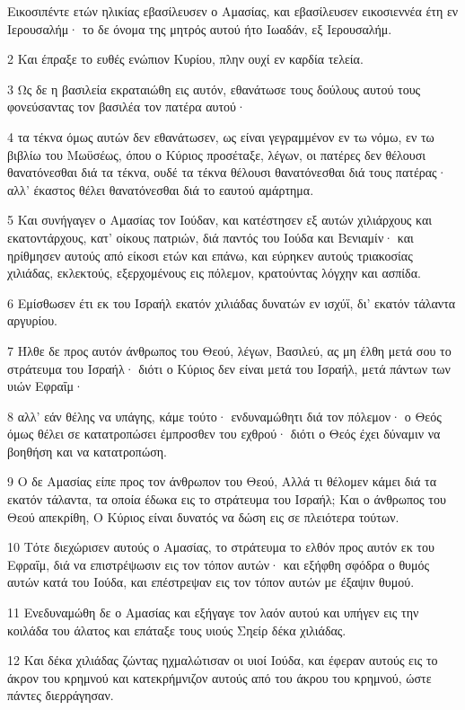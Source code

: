 \par Εικοσιπέντε ετών ηλικίας εβασίλευσεν ο Αμασίας, και εβασίλευσεν εικοσιεννέα έτη εν Ιερουσαλήμ· το δε όνομα της μητρός αυτού ήτο Ιωαδάν, εξ Ιερουσαλήμ.
\par 2 Και έπραξε το ευθές ενώπιον Κυρίου, πλην ουχί εν καρδία τελεία.
\par 3 Ως δε η βασιλεία εκραταιώθη εις αυτόν, εθανάτωσε τους δούλους αυτού τους φονεύσαντας τον βασιλέα τον πατέρα αυτού·
\par 4 τα τέκνα όμως αυτών δεν εθανάτωσεν, ως είναι γεγραμμένον εν τω νόμω, εν τω βιβλίω του Μωϋσέως, όπου ο Κύριος προσέταξε, λέγων, οι πατέρες δεν θέλουσι θανατόνεσθαι διά τα τέκνα, ουδέ τα τέκνα θέλουσι θανατόνεσθαι διά τους πατέρας· αλλ' έκαστος θέλει θανατόνεσθαι διά το εαυτού αμάρτημα.
\par 5 Και συνήγαγεν ο Αμασίας τον Ιούδαν, και κατέστησεν εξ αυτών χιλιάρχους και εκατοντάρχους, κατ' οίκους πατριών, διά παντός του Ιούδα και Βενιαμίν· και ηρίθμησεν αυτούς από είκοσι ετών και επάνω, και εύρηκεν αυτούς τριακοσίας χιλιάδας, εκλεκτούς, εξερχομένους εις πόλεμον, κρατούντας λόγχην και ασπίδα.
\par 6 Εμίσθωσεν έτι εκ του Ισραήλ εκατόν χιλιάδας δυνατών εν ισχύϊ, δι' εκατόν τάλαντα αργυρίου.
\par 7 Ήλθε δε προς αυτόν άνθρωπος του Θεού, λέγων, Βασιλεύ, ας μη έλθη μετά σου το στράτευμα του Ισραήλ· διότι ο Κύριος δεν είναι μετά του Ισραήλ, μετά πάντων των υιών Εφραΐμ·
\par 8 αλλ' εάν θέλης να υπάγης, κάμε τούτο· ενδυναμώθητι διά τον πόλεμον· ο Θεός όμως θέλει σε κατατροπώσει έμπροσθεν του εχθρού· διότι ο Θεός έχει δύναμιν να βοηθήση και να κατατροπώση.
\par 9 Ο δε Αμασίας είπε προς τον άνθρωπον του Θεού, Αλλά τι θέλομεν κάμει διά τα εκατόν τάλαντα, τα οποία έδωκα εις το στράτευμα του Ισραήλ; Και ο άνθρωπος του Θεού απεκρίθη, Ο Κύριος είναι δυνατός να δώση εις σε πλειότερα τούτων.
\par 10 Τότε διεχώρισεν αυτούς ο Αμασίας, το στράτευμα το ελθόν προς αυτόν εκ του Εφραΐμ, διά να επιστρέψωσιν εις τον τόπον αυτών· και εξήφθη σφόδρα ο θυμός αυτών κατά του Ιούδα, και επέστρεψαν εις τον τόπον αυτών με έξαψιν θυμού.
\par 11 Ενεδυναμώθη δε ο Αμασίας και εξήγαγε τον λαόν αυτού και υπήγεν εις την κοιλάδα του άλατος και επάταξε τους υιούς Σηείρ δέκα χιλιάδας.
\par 12 Και δέκα χιλιάδας ζώντας ηχμαλώτισαν οι υιοί Ιούδα, και έφεραν αυτούς εις το άκρον του κρημνού και κατεκρήμνιζον αυτούς από του άκρου του κρημνού, ώστε πάντες διερράγησαν.
